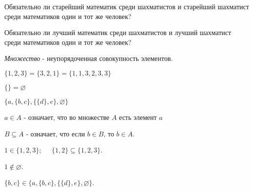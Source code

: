 \documentclass{article}
\begin{document}
    \large

    \setcounter{task_boxed}{0}

    \begin{task_boxed}
        Обязательно ли старейший математик среди шахматистов и старейший шахматист среди математиков один и тот же человек?
    \end{task_boxed}

    \begin{task_boxed}
        Обязательно ли лучший математик среди шахматистов и лучший шахматист среди математиков один и тот же человек?
    \end{task_boxed}

    \begin{definition_boxed}
        \textit{Множество} - неупорядоченная совокупность элементов.
    \end{definition_boxed}

    \begin{example}
        $\{1,2,3\} = \{3,2,1\} = \{1,1,3,2,3,3\}$
    \end{example}

    \begin{example}
        $\{\} =\varnothing$
    \end{example}

    \begin{example}
        $\{a,\{b,c\},\{\{d\},e\},\varnothing\}$
    \end{example}

    \begin{definition_boxed}
        $a \in A$ - означает, что во множестве $A$ есть элемент $a$
    \end{definition_boxed}

    \begin{definition_boxed}
        $B \subseteq A$ - означает, что если $b \in B$, то $b \in A$.
    \end{definition_boxed}

    \begin{example}
        $1\in\{1,2,3\}; \;\;\;\;\; \{1,2\}\subseteq\{1,2,3\}$.
    \end{example}

    \begin{example}
        $1\notin\varnothing$.
    \end{example}

    \begin{example}
        $\{b,c\}\in \{a,\{b,c\},\{\{d\},e\},\varnothing\}$.
    \end{example}
\end{document}
